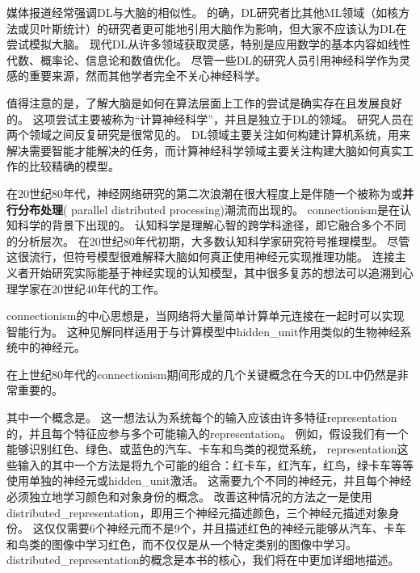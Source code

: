 媒体报道经常强调\gls{DL}与大脑的相似性。
的确，\gls{DL}研究者比其他\gls{ML}领域（如核方法或贝叶斯统计）的研究者更可能地引用大脑作为影响，但大家不应该认为\gls{DL}在尝试模拟大脑。
现代\gls{DL}从许多领域获取灵感，特别是应用数学的基本内容如线性代数、概率论、信息论和数值优化。
尽管一些\gls{DL}的研究人员引用神经科学作为灵感的重要来源，然而其他学者完全不关心神经科学。


值得注意的是，了解大脑是如何在算法层面上工作的尝试是确实存在且发展良好的。
这项尝试主要被称为``计算神经科学''，并且是独立于\gls{DL}的领域。
研究人员在两个领域之间反复研究是很常见的。
\gls{DL}领域主要关注如何构建计算机系统，用来解决需要智能才能解决的任务，而计算神经科学领域主要关注构建大脑如何真实工作的比较精确的模型。

在20世纪80年代，神经网络研究的第二次浪潮在很大程度上是伴随一个被称为或\textbf{并行分布处理}( parallel distributed processing)潮流而出现的\citep{Rumelhart86,mcclelland1995appeal}。
\gls{connectionism}是在认知科学的背景下出现的。
认知科学是理解心智的跨学科途径，即它融合多个不同的分析层次。
在20世纪80年代初期，大多数认知科学家研究符号推理模型。
尽管这很流行，但符号模型很难解释大脑如何真正使用神经元实现推理功能。 
连接主义者开始研究实际能基于神经实现的认知模型\citep{Touretzky1985}，其中很多复苏的想法可以追溯到心理学家在20世纪40年代的工作\citep{Hebb49}。

\gls{connectionism}的中心思想是，当网络将大量简单计算单元连接在一起时可以实现智能行为。
这种见解同样适用于与计算模型中\gls{hidden_unit}作用类似的生物神经系统中的神经元。  

在上世纪80年代的\gls{connectionism}期间形成的几个关键概念在今天的\gls{DL}中仍然是非常重要的。

其中一个概念是\citep{Hinton-et-al-PDP1986}。
这一想法认为系统每个的输入应该由许多特征\gls{representation}的，并且每个特征应参与多个可能输入的\gls{representation}。
例如，假设我们有一个能够识别红色、绿色、或蓝色的汽车、卡车和鸟类的视觉系统，
\gls{representation}这些输入的其中一个方法是将九个可能的组合：红卡车，红汽车，红鸟，绿卡车等等使用单独的神经元或\gls{hidden_unit}激活。
这需要九个不同的神经元，并且每个神经必须独立地学习颜色和对象身份的概念。
改善这种情况的方法之一是使用\gls{distributed_representation}，即用三个神经元描述颜色，三个神经元描述对象身份。 
这仅仅需要6个神经元而不是9个，并且描述红色的神经元能够从汽车、卡车和鸟类的图像中学习红色，而不仅仅是从一个特定类别的图像中学习。 
\gls{distributed_representation}的概念是本书的核心，我们将在中更加详细地描述。

